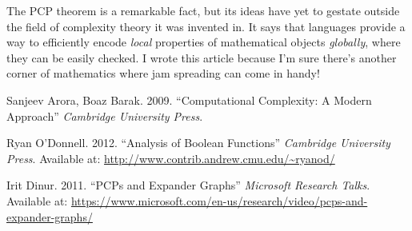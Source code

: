 \documentclass{article}
\theoremstyle{plain}
\theoremstyle{remark}
\theoremstyle{definition}
\begin{document}
\begin{multicols}{2}
The PCP theorem is a remarkable fact, but its ideas have yet to gestate outside the field of complexity theory it was invented in. It says that languages provide a way to efficiently encode {\it local} properties of mathematical objects {\it globally}, where they can be easily checked. I wrote this article because I'm sure there's another corner of mathematics where jam spreading can come in handy!

\begin{thebibliography}{9}

Sanjeev Arora, Boaz Barak. 2009.
``Computational Complexity: A Modern Approach'' {\it Cambridge University Press}.

Ryan O'Donnell. 2012.
``Analysis of Boolean Functions'' {\it Cambridge University Press}. Available at: \url{http://www.contrib.andrew.cmu.edu/~ryanod/}

Irit Dinur. 2011.
``PCPs and Expander Graphs'' {\it Microsoft Research Talks}. Available at: \url{https://www.microsoft.com/en-us/research/video/pcps-and-expander-graphs/}

\end{thebibliography}

\end{multicols}
\end{document}
